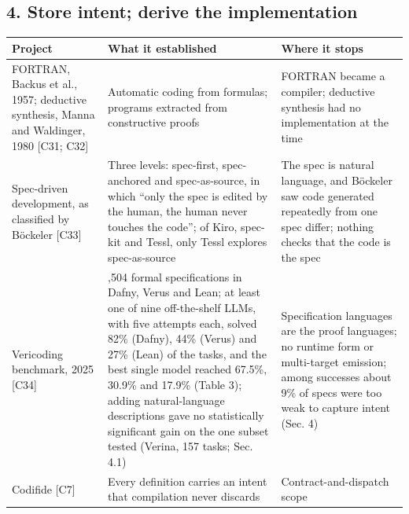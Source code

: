 \documentclass[10pt,letterpaper]{article}
\begin{document}
\subsection{4. Store intent; derive the
implementation}\label{store-intent-derive-the-implementation}

{\footnotesize\setlength{\tabcolsep}{3.8pt}\renewcommand{\arraystretch}{1.15}
\begin{longtable}[]{@{}
  >{\raggedright\arraybackslash}p{}
  >{\raggedright\arraybackslash}p{}
  >{\raggedright\arraybackslash}p{}@{}}
\toprule\noalign{}
\begin{minipage}[b]{\linewidth}\raggedright
\textbf{Project}
\end{minipage} & \begin{minipage}[b]{\linewidth}\raggedright
\textbf{What it established}
\end{minipage} & \begin{minipage}[b]{\linewidth}\raggedright
\textbf{Where it stops}
\end{minipage} \\
\midrule\noalign{}
\endhead
\bottomrule\noalign{}
\endlastfoot
FORTRAN, Backus et al., 1957; deductive synthesis, Manna and Waldinger,
1980 {[}C31; C32{]} & Automatic coding from formulas; programs extracted
from constructive proofs & FORTRAN became a compiler; deductive
synthesis had no implementation at the time \\
Spec-driven development, as classified by Böckeler {[}C33{]} & Three
levels: spec-first, spec-anchored and spec-as-source, in which ``only
the spec is edited by the human, the human never touches the code''; of
Kiro, spec-kit and Tessl, only Tessl explores spec-as-source & The spec
is natural language, and Böckeler saw code generated repeatedly from one
spec differ; nothing checks that the code is the spec \\
Vericoding benchmark, 2025 {[}C34{]} & 12,504 formal specifications in
Dafny, Verus and Lean; at least one of nine off-the-shelf LLMs, with
five attempts each, solved 82\% (Dafny), 44\% (Verus) and 27\% (Lean) of
the tasks, and the best single model reached 67.5\%, 30.9\% and 17.9\%
(Table 3); adding natural-language descriptions gave no statistically
significant gain on the one subset tested (Verina, 157 tasks; Sec. 4.1)
& Specification languages are the proof languages; no runtime form or
multi-target emission; among successes about 9\% of specs were too weak
to capture intent (Sec. 4) \\
Codifide {[}C7{]} & Every definition carries an intent that compilation
never discards & Contract-and-dispatch scope \\
\end{longtable}
}
\end{document}
